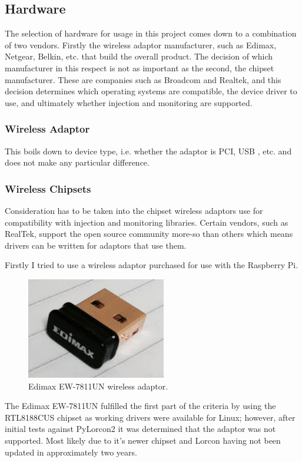 \subsection{Hardware}
\label{research:hardware}
The selection of hardware for usage in this project comes down to a combination of two vendors. Firstly the wireless adaptor manufacturer, such as Edimax, Netgear, Belkin, etc. that build the overall product. The decision of which manufacturer in this respect is not as important as the second, the chipset manufacturer.  These are companies such as Broadcom and Realtek, and this decision determines which operating systems are compatible, the device driver to use, and ultimately whether injection and monitoring are supported.

\subsubsection{Wireless Adaptor}
This boils down to device type, i.e. whether the adaptor is PCI, USB , etc. and does not make any particular difference.
\subsubsection{Wireless Chipsets}
Consideration has to be taken into the chipset wireless adaptors use for compatibility with injection and monitoring libraries. Certain vendors, such as RealTek, support the open source community more-so than others which means drivers can be written for adaptors that use them.

Firstly I tried to use a wireless adaptor purchased for use with the Raspberry Pi.

\begin{figure}[h!]
\centering\includegraphics{research/figures/edimax.png}
\caption{Edimax EW-7811UN wireless adaptor.}
\end{figure}

The Edimax EW-7811UN fulfilled the first part of the criteria by using the RTL8188CUS chipset as working drivers were available for Linux; however, after initial tests against PyLorcon2 it was determined that the adaptor was not supported. Most likely due to it's newer chipset and Lorcon having not been updated in approximately two years. 

